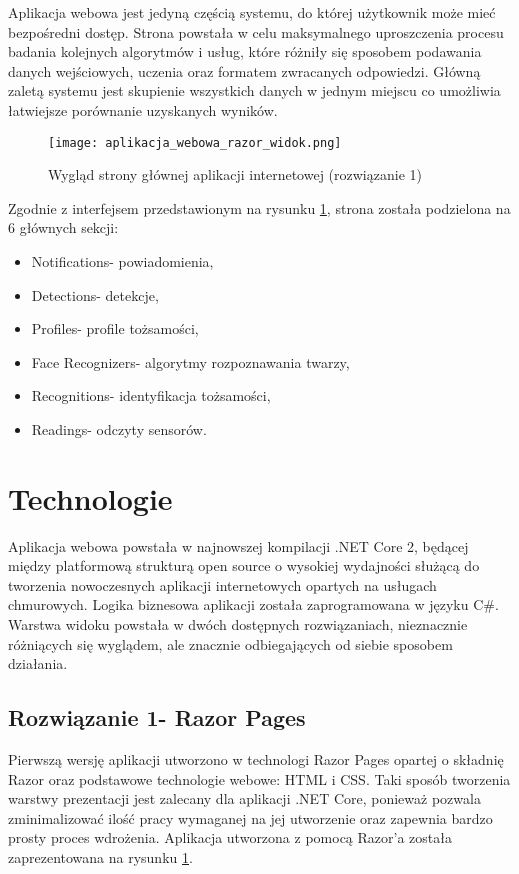 Aplikacja webowa jest jedyną częścią systemu, do której użytkownik może mieć bezpośredni dostęp. Strona powstała w celu maksymalnego uproszczenia procesu badania kolejnych algorytmów i usług, które różniły się sposobem podawania danych wejściowych, uczenia oraz formatem zwracanych odpowiedzi. Główną zaletą systemu jest skupienie wszystkich danych w jednym miejscu co umożliwia łatwiejsze porównanie uzyskanych wyników.
\begin{figure}[H]
	\centering
	\texttt{[image: aplikacja\_webowa\_razor\_widok.png]}
	\caption{Wygląd strony głównej aplikacji internetowej (rozwiązanie 1)}
	\label{fig:strona_glowna_razor}
\end{figure}
\pagebreak
Zgodnie z interfejsem przedstawionym na rysunku \ref{fig:strona_glowna_razor}, strona została podzielona na 6 głównych sekcji:
\begin{itemize}
\item Notifications- powiadomienia,
\item Detections- detekcje,
\item Profiles- profile tożsamości,
\item Face Recognizers- algorytmy rozpoznawania twarzy,
\item Recognitions- identyfikacja tożsamości,
\item Readings- odczyty sensorów.
\end{itemize}

\section{Technologie}\label{s:web_technologie}
Aplikacja webowa powstała w najnowszej kompilacji .NET Core 2, będącej między platformową strukturą open source o wysokiej wydajności służącą do tworzenia nowoczesnych aplikacji internetowych opartych na usługach chmurowych. Logika biznesowa aplikacji została zaprogramowana w języku C\#. Warstwa widoku powstała w dwóch dostępnych rozwiązaniach, nieznacznie różniących się wyglądem, ale znacznie odbiegających od siebie sposobem działania.

\subsection{Rozwiązanie 1- Razor Pages}
Pierwszą wersję aplikacji utworzono w technologi Razor Pages opartej o składnię Razor oraz podstawowe technologie webowe: HTML i CSS. Taki sposób tworzenia warstwy prezentacji jest zalecany dla aplikacji .NET Core, ponieważ pozwala zminimalizować ilość pracy wymaganej na jej utworzenie oraz zapewnia bardzo prosty proces wdrożenia. Aplikacja utworzona z pomocą Razor'a została zaprezentowana na rysunku \ref{fig:strona_glowna_razor}.

